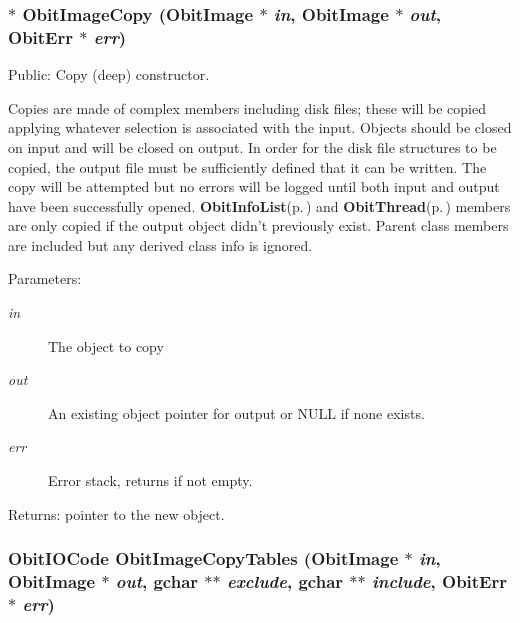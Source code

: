 \subsubsection{$\ast$ Obit\-Image\-Copy ({\bf Obit\-Image} $\ast$ {\em in}, {\bf Obit\-Image} $\ast$ {\em out}, {\bf Obit\-Err} $\ast$ {\em err})}\label{ObitImage_8h_a24}


Public: Copy (deep) constructor. 

Copies are made of complex members including disk files; these will be copied applying whatever selection is associated with the input. Objects should be closed on input and will be closed on output. In order for the disk file structures to be copied, the output file must be sufficiently defined that it can be written. The copy will be attempted but no errors will be logged until both input and output have been successfully opened. {\bf Obit\-Info\-List}{\rm (p.\,\pageref{structObitInfoList})} and {\bf Obit\-Thread}{\rm (p.\,\pageref{structObitThread})} members are only copied if the output object didn't previously exist. Parent class members are included but any derived class info is ignored. \begin{Desc}
\item[Parameters:]
\begin{description}
\item[{\em in}]The object to copy \item[{\em out}]An existing object pointer for output or NULL if none exists. \item[{\em err}]Error stack, returns if not empty. \end{description}
\end{Desc}
\begin{Desc}
\item[Returns:]pointer to the new object. \end{Desc}
\subsubsection{\setlength{\rightskip}{0pt plus 5cm}Obit\-IOCode Obit\-Image\-Copy\-Tables ({\bf Obit\-Image} $\ast$ {\em in}, {\bf Obit\-Image} $\ast$ {\em out}, gchar $\ast$$\ast$ {\em exclude}, gchar $\ast$$\ast$ {\em include}, {\bf Obit\-Err} $\ast$ {\em err})}\label{ObitImage_8h_a37}


